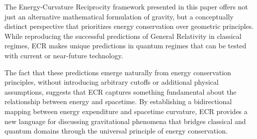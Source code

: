 \documentclass[11pt,a4paper]{article}
\begin{document}
The Energy-Curvature Reciprocity framework presented in this paper offers not just an alternative mathematical formulation of gravity, but a conceptually distinct perspective that prioritizes energy conservation over geometric principles. While reproducing the successful predictions of General Relativity in classical regimes, ECR makes unique predictions in quantum regimes that can be tested with current or near-future technology.

The fact that these predictions emerge naturally from energy conservation principles, without introducing arbitrary cutoffs or additional physical assumptions, suggests that ECR captures something fundamental about the relationship between energy and spacetime. By establishing a bidirectional mapping between energy expenditure and spacetime curvature, ECR provides a new language for discussing gravitational phenomena that bridges classical and quantum domains through the universal principle of energy conservation.



\end{document}
